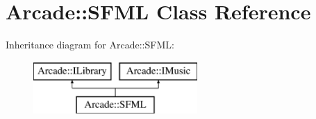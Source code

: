 \hypertarget{class_arcade_1_1_s_f_m_l}{}\section{Arcade\+:\+:S\+F\+ML Class Reference}
\label{class_arcade_1_1_s_f_m_l}
Inheritance diagram for Arcade\+:\+:S\+F\+ML\+:\begin{figure}[H]
\begin{center}
\leavevmode
\includegraphics[height=2.000000cm]{class_arcade_1_1_s_f_m_l}
\end{center}
\end{figure}
